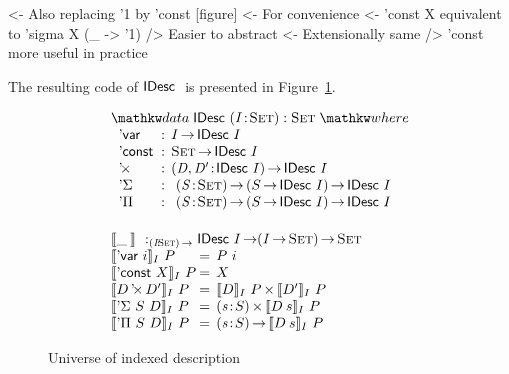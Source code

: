 \begin{wstructure}
<- Also replacing '1 by 'const  [figure]
    <- For convenience
        <- 'const X equivalent to 'sigma X (\_ -> '1)
        /> Easier to abstract
            <- Extensionally same
            /> 'const more useful in practice
\end{wstructure}

The resulting code of $\IDesc$ is presented in
Figure~\ref{fig:idesc}. 

\begin{figure}

\[\stk{
\begin{array}{ll}
\stk{
\data \IDesc{} (\Bhab{\V{I}}{\Set}) : \Set \where \\
\;\;\begin{array}{@{}l@{\::\:\:}l@{\quad}l}
    \DVar{}         & I \To \IDesc{I}                                   \\
    \DConst{}       & \Set \To \IDesc{I}                                \\
    \DProd{}{}      & \PI{\V{D}, \V{D'}}{\IDesc{I}} \IDesc{I}           \\
    \DSigma         & \PI{\V{S}}{\Set} \PIS{S \To \IDesc{I}} \IDesc{I}  \\
    \DPi            & \PI{\V{S}}{\Set} \PIS{S \To \IDesc{I}} \IDesc{I} 
\end{array}
}
\vspace{0.2in}
\\
\stk{
\idescop{\_\:}{}{} :_{\PI{\V{I}}{\Set}} \IDesc{I} \To (\V{I} \To \Set) \To \Set                  \\
\begin{array}{@{}l@{\:=\:\:}ll}
\idescop{\DVar{i}}{I}{P}      &  P~i                                                 \\
\idescop{\DConst{X}}{I}{P}    &  X                                                   \\
\idescop{\DProd{D}{D'}}{I}{P} &  \TIMES{\idescop{D}{I}{P}}{\idescop{D'}{I}{P}}       \\
\idescop{\DSigma{S}{D}}{I}{P} &  \SIGMA{\V{s}}{S} \idescop{D\: s}{I}{P}                    \\
\idescop{\DPi{S}{D}}{I}{P}    &  \PI{\V{s}}{S} \idescop{D\: s}{I}{P}            
\end{array}
}
\end{array}
}\]

\caption{Universe of indexed description}
\label{fig:idesc}

\end{figure}

